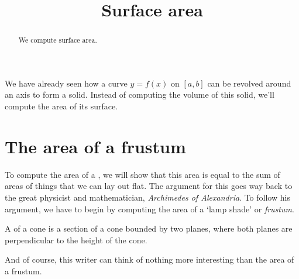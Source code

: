 \documentclass{ximera}
\title[Dig-In:]{Surface area}
\begin{document}
\begin{abstract}
We compute surface area.
\end{abstract}
\maketitle


We have already seen how a curve $y=f(x)$ on $[a,b]$ can be revolved
around an axis to form a solid. Instead of computing the volume of
this solid, we'll compute the area of its surface.

\section{The area of a frustum}

To compute the area of a , we will show
that this area is equal to the sum of areas of things that we can
lay out flat. The argument for this goes way back to the great
physicist and mathematician, \textit{Archimedes of Alexandria}. To follow his
argument, we have to begin by computing the area of a `lamp shade' or
\textit{frustum}.

\begin{definition}
  A  of a cone is a section of a cone bounded by two
  planes, where both planes are perpendicular to the height of the
  cone.
  \begin{image}
  \end{image}
\end{definition}

And of course, this writer can think of nothing more interesting than
the area of a frustum.
\end{document}
